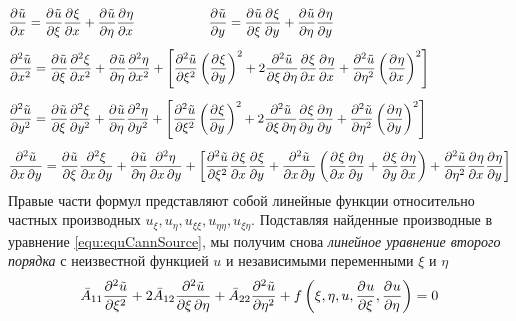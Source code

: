 \begin{align*}
	&\derp{\tilde u}{x}{} = \derp{\tilde u}{\xi}{} \derp{\xi}{x}{} + \derp{ \tilde u}{\eta}{} \derp{\eta}{x}{} \hspace{2cm} \derp{\tilde u}{y}{} = \derp{ \tilde u}{\xi}{} \derp{\xi}{y}{} + \derp{ \tilde u}{\eta}{} \derp{\eta}{y}{}\\[5pt]
	&\derp{\tilde u}{x}{2} = \derp{\tilde u}{\xi}{} \derp{\xi}{x}{2} + \derp{\tilde u}{\eta}{} \derp{\eta}{x}{2} + \left[\derp{\tilde u}{\xi}{2} \left(\derp{\xi}{y}{} \right)^2 + 2 \derps{\tilde u}{\xi}{\eta} \derp{\xi}{x}{} \derp{\eta}{x}{} + \derp{\tilde u}{\eta}{2} \left(\derp{\eta}{x}{} \right)^2 \right]\\[5pt]
	&\derp{\tilde u}{y}{2} = \derp{\tilde u}{\xi}{} \derp{\xi}{y}{2} + \derp{\tilde u}{\eta}{} \derp{\eta}{y}{2} + \left[\derp{\tilde u}{\xi}{2} \left( \derp{\xi}{y}{}\right)^2 + 2 \derps{\tilde u}{\xi}{\eta} \derp{\xi}{y}{} \derp{\eta}{y}{} + \derp{\tilde u}{\eta}{2} \left(\derp{\eta}{y}{} \right)^2 \right]\\[5pt]
	&\derps{\tilde u}{x}{y} = \derp{\tilde u}{\xi}{} \derps{\xi}{x}{y} + \derp{\tilde u}{\eta}{} \derps{\eta}{x}{y} + \left[\derp{\tilde u}{\xi}{2} \derp{\xi}{x}{} \derp{\xi}{y}{} + \derps{\tilde u}{x}{y} \left(\derp{\xi}{x}{}\derp{\eta}{y}{} + \derp{\xi}{y}{} \derp{\eta}{x}{}\right) + \derp{\tilde u}{\eta}{2} \derp{\eta}{x}{} \derp{\eta}{y}{} \right]	
\end{align*}
Правые части формул представляют собой линейные функции относительно частных производных $u_\xi, u_\eta, u_{\xi \xi}, u_{\eta \eta}, u_{\xi \eta}$. Подставляя найденные производные в уравнение \eqref{equ:equCannSource}, мы получим снова \textit{линейное уравнение второго порядка} с неизвестной функцией $u$ и независимыми переменными $\xi$ и $\eta$
\begin{equation}
	\bar A_{11} \derp{\tilde u}{\xi}{2} + 2 \bar A_{12} \derps{\tilde u}{\xi}{\eta}  + \bar A_{22} \derp{\tilde u}{\eta}{2} + f\left(\xi, \eta, u, \derp{u}{\xi}{}, \derp{u}{\eta}{}\right) = 0
	\label{equ:equCann2}
\end{equation}
